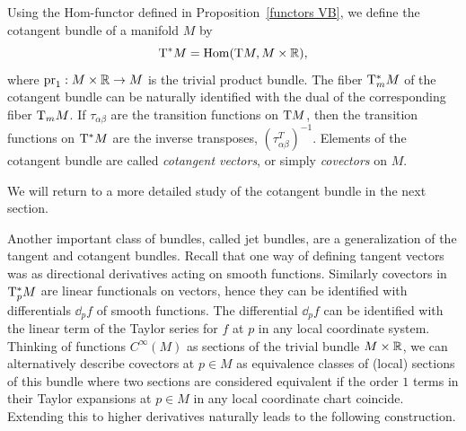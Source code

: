 \begin{defn}
    Using the Hom-functor defined in Proposition~\ref{functors VB}, we define the cotangent bundle of a manifold $M$ by 
    \[\mathrm{T}^\ast M=\operatorname{Hom}(\mathrm{T} M,M\times\mathbb{R}),\]
    where $\operatorname{pr}_1:M\times\mathbb{R}\to M$ is the trivial product bundle. The fiber $\mathrm{T}^\ast_m M$ of the cotangent bundle can be naturally identified with the dual of the corresponding fiber $\mathrm{T}_mM$. If $\tau_{\alpha\beta}$ are the transition functions on $\mathrm{T} M$, then the transition functions on $\mathrm{T}^\ast M$ are the inverse transposes, $(\tau_{\alpha\beta}^T)^{-1}$. Elements of the cotangent bundle are called \emph{cotangent vectors}, or simply \emph{covectors} on $M$.
\end{defn}
We will return to a more detailed study of the cotangent bundle in the next section.

Another important class of bundles, called jet bundles, are a generalization of the tangent and cotangent bundles. Recall that one way of defining tangent vectors was as directional derivatives acting on smooth functions. Similarly covectors in $\mathrm{T}_p^\ast M$ are linear functionals on vectors, hence they can be identified with differentials $\dd_p f$ of smooth functions. The differential $\dd_p f$ can be identified with the linear term of the Taylor series for $f$ at $p$ in any local coordinate system. Thinking of functions $C^\infty(M)$ as sections of the trivial bundle $M\times\mathbb{R}$, we can alternatively describe covectors at $p\in M$ as equivalence classes of (local) sections of this bundle where two sections are considered equivalent if the order $1$ terms in their Taylor expansions at $p\in M$ in any local coordinate chart coincide. Extending this to higher derivatives naturally leads to the following construction.

